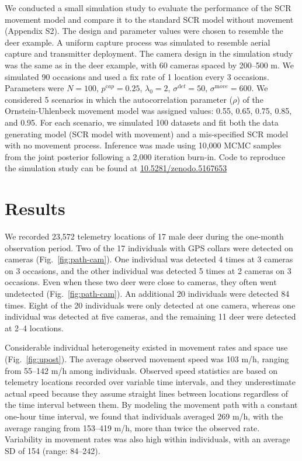 \documentclass[12pt]{article}
\begin{document}
We conducted a small simulation study to evaluate the performance of the
SCR movement model and compare it to the standard SCR model without
movement (Appendix S2). The design and parameter values were chosen to
resemble the deer example. A uniform capture process was
simulated to resemble aerial capture and transmitter
deployment. The camera design in the simulation study was the same as
in the deer example, with 60 cameras spaced by 200--500 m. We simulated
90 occasions and used a fix rate of 1 location every 3
occasions. Parameters were $N=100$,
$p^{\mathrm cap}=0.25$, $\lambda_0=2$, $\sigma^{\mathrm det}=50$,
$\sigma^{\mathrm move}=600$. We 
considered 5 scenarios in which the autocorrelation parameter ($\rho$)
of the Ornstein-Uhlenbeck movement model was assigned values: 0.55,
0.65, 0.75, 0.85, and 0.95. For each scenario, we simulated 100
datasets and fit both the data generating model (SCR model with
movement) and a mis-specified SCR model with no movement
process. Inference was made using 10,000 MCMC samples from the joint
posterior following a 2,000 iteration burn-in. Code to reproduce the
simulation study can be found at
\url{10.5281/zenodo.5167653}


\section{Results}

We recorded 23,572 telemetry locations of 17 male deer during the
one-month observation period. Two of the 17 individuals with GPS
collars were detected on cameras (Fig.~\ref{fig:path-cam}). One
individual was detected 4 times at 3 cameras on 3 occasions, and the
other individual was detected 5 times at 2 cameras on 3
occasions. Even when these two deer were close to cameras, they often
went undetected (Fig.~\ref{fig:path-cam}). An additional 20
individuals were detected 84 times. Eight 
of the 20 individuals were only detected at one camera, whereas one
individual was detected at five cameras, and the remaining 11 deer
were detected at 2--4 locations.

Considerable individual heterogeneity existed in movement rates and
space use (Fig.~\ref{fig:upost}).
The average observed movement speed was 103 m/h,
ranging from 55--142 m/h among individuals.
Observed speed statistics are based on telemetry locations
recorded over variable time intervals, and they underestimate actual
speed because they assume straight lines between locations regardless
of the time interval between them. By modeling the movement path with
a constant one-hour time interval, we found that individuals averaged
269 m/h, with the average ranging from 153--419 m/h, more than twice
the observed rate. Variability in movement rates was also high within
individuals, with an average SD of 154 (range: 84--242).
\end{document}
